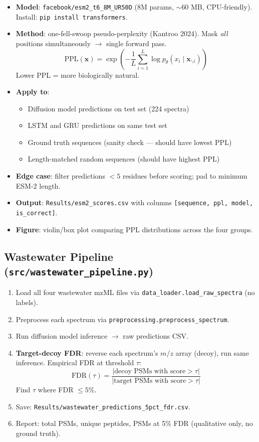 \documentclass[11pt,letterpaper]{article}
\begin{document}
\begin{itemize}
  \item \textbf{Model}: \texttt{facebook/esm2\_t6\_8M\_UR50D} (8M params, $\sim$60 MB, CPU-friendly).
    Install: \texttt{pip install transformers}.
  \item \textbf{Method}: one-fell-swoop pseudo-perplexity (Kantroo 2024).
    Mask \textit{all} positions simultaneously $\rightarrow$ single forward pass.
    \[ \text{PPL}(\mathbf{x}) = \exp\!\left(-\frac{1}{L}\sum_{i=1}^{L}\log p_\theta(x_i \mid \mathbf{x}_{\backslash i})\right) \]
    Lower PPL = more biologically natural.
  \item \textbf{Apply to}:
    \begin{itemize}
      \item Diffusion model predictions on test set (224 spectra)
      \item LSTM and GRU predictions on same test set
      \item Ground truth sequences (sanity check --- should have lowest PPL)
      \item Length-matched random sequences (should have highest PPL)
    \end{itemize}
  \item \textbf{Edge case}: filter predictions $< 5$ residues before scoring; pad to minimum ESM-2 length.
  \item \textbf{Output}: \texttt{Results/esm2\_scores.csv} with columns
    \texttt{[sequence, ppl, model, is\_correct]}.
  \item \textbf{Figure}: violin/box plot comparing PPL distributions across the four groups.
\end{itemize}

\subsection*{Wastewater Pipeline (\texttt{src/wastewater\_pipeline.py})}
\begin{enumerate}
  \item Load all four wastewater mzML files via \texttt{data\_loader.load\_raw\_spectra} (no labels).
  \item Preprocess each spectrum via \texttt{preprocessing.preprocess\_spectrum}.
  \item Run diffusion model inference $\rightarrow$ raw predictions CSV.
  \item \textbf{Target-decoy FDR}: reverse each spectrum's $m/z$ array (decoy), run same inference.
    Empirical FDR at threshold $\tau$:
    \[ \text{FDR}(\tau) = \frac{|\text{decoy PSMs with score} > \tau|}{|\text{target PSMs with score} > \tau|} \]
    Find $\tau$ where FDR $\leq 5\%$.
  \item Save: \texttt{Results/wastewater\_predictions\_5pct\_fdr.csv}.
  \item Report: total PSMs, unique peptides, PSMs at 5\% FDR (qualitative only, no ground truth).
\end{enumerate}
\end{document}
